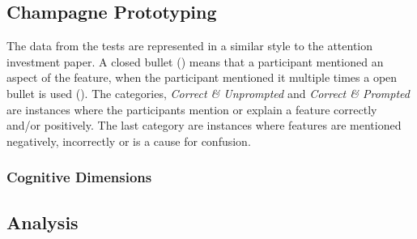 \subsection{Champagne Prototyping}
\metasheep

The data from the tests are represented in a similar style to the attention investment paper\cite{blackwell2002first}. A closed bullet (\mn) means that a participant mentioned an aspect of the feature, when the participant mentioned it multiple times a open bullet is used (\mns). The categories, \textit{Correct \& Unprompted} and \textit{Correct \& Prompted} are instances where the participants mention or explain a feature correctly and/or positively. The last category are instances where features are mentioned negatively, incorrectly or is a cause for confusion.



\subsubsection{Cognitive Dimensions}
\metasheep

\begin{table}[H]
	\caption{Cognitive Dimensions Findings}
	\label{tab:cog-dim-findings}
\end{table}

\subsection{Analysis}
\metasheep




